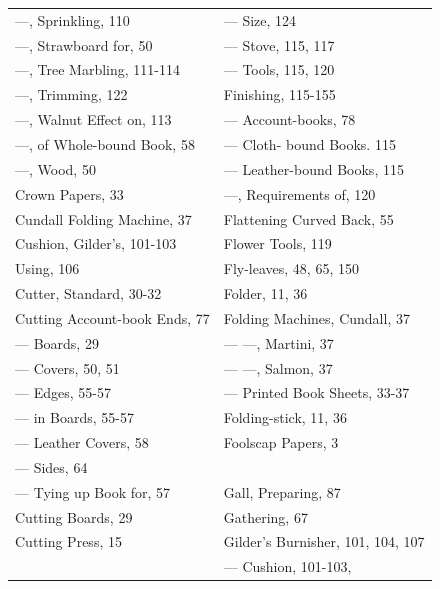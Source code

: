 \documentclass[twoside]{book}
\begin{document}
\begin{center}
\begin{tiny}
\begin{tabular}{l|l}
---, Sprinkling, 110             & --- Size, 124                        \\
---, Strawboard for, 50          & --- Stove, 115, 117                  \\
---, Tree Marbling, 111-114      & --- Tools, 115, 120                  \\
---, Trimming, 122               & Finishing, 115-155                   \\
---, Walnut Effect on, 113       & --- Account-books, 78                \\
---, of Whole-bound Book, 58     & --- Cloth- bound Books. 115          \\
---, Wood, 50                    & --- Leather-bound Books, 115         \\
Crown Papers, 33                 & ---, Requirements of, 120            \\
Cundall Folding Machine, 37      & Flattening Curved Back, 55           \\
Cushion, Gilder's, 101-103       & Flower Tools, 119                    \\
    Using, 106                   & Fly-leaves, 48, 65, 150              \\
Cutter, Standard, 30-32          & Folder, 11, 36                       \\
Cutting Account-book Ends, 77    & Folding Machines, Cundall, 37        \\
--- Boards, 29                   & --- ---, Martini, 37                 \\
--- Covers, 50, 51               & --- ---, Salmon, 37                  \\
--- Edges, 55-57                 & --- Printed Book Sheets, 33-37       \\
--- in Boards, 55-57             & Folding-stick, 11, 36                \\
--- Leather Covers, 58           & Foolscap Papers, 3                   \\
--- Sides, 64                    &                                      \\
--- Tying up Book for, 57        & Gall, Preparing, 87                  \\
Cutting Boards, 29               & Gathering, 67                        \\
Cutting Press, 15                & Gilder's Burnisher, 101, 104, 107    \\
                                 & --- Cushion, 101-103,                \\

\end{tabular}
\end{tiny}
\end{center}
\end{document}
